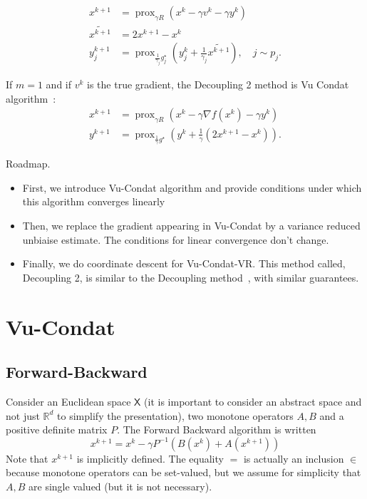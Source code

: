 \documentclass{article}
\DeclareMathOperator{\prox}{prox}
\newcommand{\bR}{{\mathbb R}}
\newcommand{\sX}{{\mathsf X}}
\theoremstyle{definition}
\begin{document}
\begin{align}
    x^{k+1}   &= \prox_{\gamma R}(x^k - \gamma v^k - \gamma y^k)\\
    \widetilde{x^{k+1}} &= 2x^{k+1} - x^k\\
    y_j^{k+1} &= \prox_{\frac{1}{\gamma_j} g_j^\star}(y_j^k + \frac{1}{\gamma_j}\widetilde{x^{k+1}} ), \quad j \sim p_j.
\end{align}

If $m=1$ and if $v^k$ is the true gradient, the Decoupling 2 method is Vu Condat algorithm~\cite{con-jota13}:
\begin{align}
    x^{k+1}   &= \prox_{\gamma R}(x^k - \gamma \nabla f(x^k) - \gamma y^k)\\
    y^{k+1} &= \prox_{\frac{1}{\gamma} g^\star}(y^k + \frac{1}{\gamma}(2x^{k+1}-x^k)).
\end{align}



Roadmap.
\begin{itemize}
    \item First, we introduce Vu-Condat algorithm and provide conditions under which this algorithm converges linearly
    \item Then, we replace the gradient appearing in Vu-Condat by a variance reduced unbiaise estimate. The conditions for linear convergence don't change.
    \item Finally, we do coordinate descent for Vu-Condat-VR. This method called, Decoupling 2, is similar to the Decoupling method~\cite{mishchenko2019stochastic}, with similar guarantees. 
\end{itemize}

\section{Vu-Condat}
\subsection{Forward-Backward}
Consider an Euclidean space $\sX$ (it is important to consider an abstract space and not just $\bR^d$ to simplify the presentation), two monotone operators $A,B$ and a positive definite matrix $P$.
The Forward Backward algorithm is written
\begin{equation}
    \label{eq:FB}
    x^{k+1} = x^k - \gamma P^{-1} (B(x^k) + A(x^{k+1}))
\end{equation}
Note that $x^{k+1}$ is implicitly defined. The equality $=$ is actually an inclusion $\in$ because monotone operators can be set-valued, but we assume for simplicity that $A,B$ are single valued (but it is not necessary).
\end{document}
